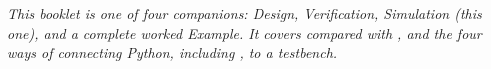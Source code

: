 \cleardoublepage
\thispagestyle{empty}
\vspace*{\fill}
\begin{center}
\begin{minipage}{0.78\textwidth}
\small\itshape
This booklet is one of four companions: Design, Verification, Simulation
(this one), and a complete worked Example. It covers 
compared with , and the four ways of connecting Python,
including , to a testbench.
\end{minipage}
\end{center}
\vspace*{\fill}
\cleardoublepage
